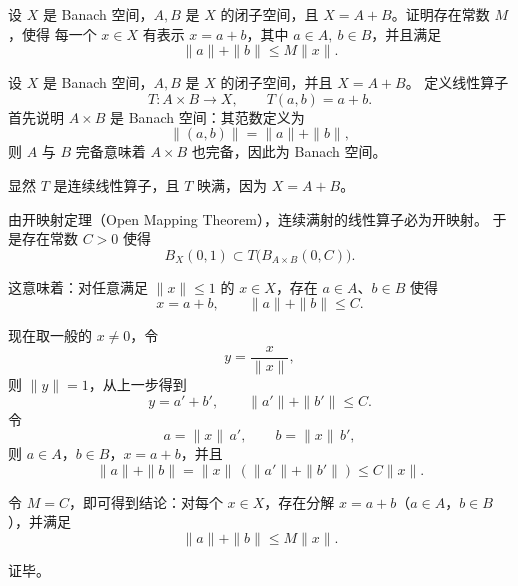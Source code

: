 \begin{homework}[题目 10]

设 $X$ 是 Banach 空间，$A,B$ 是 $X$ 的闭子空间，且 $X=A+B$。证明存在常数 $M$，使得  
每一个 $x\in X$ 有表示 $x=a+b$，其中 $a\in A,\ b\in B$，并且满足
\[
\|a\| + \|b\| \le M\|x\|.
\]

\end{homework}
\begin{solution}
设 $X$ 是 Banach 空间，$A,B$ 是 $X$ 的闭子空间，并且 $X=A+B$。
定义线性算子
\[
T: A\times B \to X,\qquad T(a,b)=a+b.
\]
首先说明 $A\times B$ 是 Banach 空间：其范数定义为
\[
\|(a,b)\|=\|a\|+\|b\|,
\]
则 $A$ 与 $B$ 完备意味着 $A\times B$ 也完备，因此为 Banach 空间。

显然 $T$ 是连续线性算子，且 $T$ 映满，因为 $X=A+B$。

由开映射定理（Open Mapping Theorem），连续满射的线性算子必为开映射。
于是存在常数 $C>0$ 使得
\[
B_X(0,1)\subset T\bigl(B_{A\times B}(0,C)\bigr).
\]

这意味着：对任意满足 $\|x\|\le1$ 的 $x\in X$，存在 $a\in A$、$b\in B$ 使得
\[
x=a+b,\qquad \|a\|+\|b\|\le C.
\]

现在取一般的 $x\ne0$，令
\[
y=\frac{x}{\|x\|},
\]
则 $\|y\|=1$，从上一步得到
\[
y=a'+b',\qquad \|a'\|+\|b'\|\le C.
\]
令
\[
a=\|x\|\,a',\qquad b=\|x\|\,b',
\]
则 $a\in A$，$b\in B$，$x=a+b$，并且
\[
\|a\|+\|b\|
=\|x\|\,(\|a'\|+\|b'\|)
\le C\|x\|.
\]

令 $M=C$，即可得到结论：对每个 $x\in X$，存在分解 $x=a+b$（$a\in A$，$b\in B$），并满足
\[
\|a\|+\|b\|\le M\|x\|.
\]

证毕。
\end{solution}




